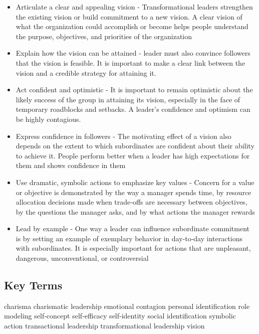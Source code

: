 \begin{itemize}
	\item Articulate a clear and appealing vision - Transformational leaders strengthen the existing vision or build commitment to a new vision. A clear vision of what the organization could accomplish or become helps people understand the purpose, objectives, and priorities of the organization
	\item Explain how the vision can be attained - leader must also convince followers that the vision is feasible. It is important to make a clear link between the vision and a credible strategy for attaining it.
	\item Act confident and optimistic - It is important to remain optimistic about the likely success of the group in attaining its vision, especially in the face of temporary roadblocks and setbacks. A leader’s confidence and optimism can be highly contagious.
	\item Express confidence in followers - The motivating effect of a vision also depends on the extent to which subordinates are confident about their ability to achieve it. People perform better when a leader has high expectations for them and shows confidence in them
	\item Use dramatic, symbolic actions to emphasize key values - Concern for a value or objective is demonstrated by the way a manager spends time, by resource allocation decisions made when trade‐offs are necessary between objectives, by the questions the manager asks, and by what actions the manager rewards
	\item Lead by example - One way a leader can influence subordinate commitment is by setting an example of exemplary behavior in day‐to‐day interactions with subordinates. It is especially important for actions that are unpleasant, dangerous, unconventional, or controversial
\end{itemize}

\subsection{Key Terms} %
\label{sub:key_terms}
charisma
charismatic leadership
emotional contagion
personal identification
role modeling
self‐concept
self‐efficacy
self‐identity
social identification
symbolic action
transactional leadership
transformational leadership
vision

